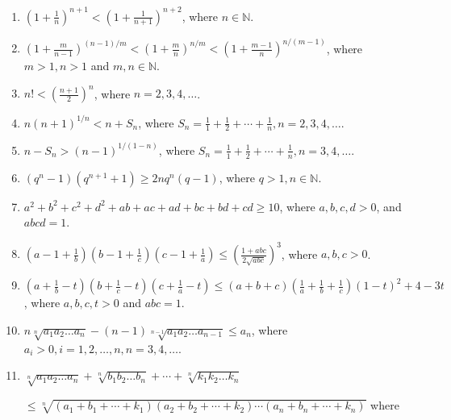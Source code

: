 \begin{enumerate}
\item $\left(1 + \frac{1}{n}\right)^{n + 1} < \left(1 + \frac{1}{n + 1}\right)^{n + 2}$, where $n\in\mathbb{N}$.
\item $\left(1 + \frac{m}{n - 1}\right)^{(n - 1)/m} < \left(1 + \frac{m}{n}\right)^{n/m} < \left(1 + \frac{m - 1}{n}\right)^{n/(m
  - 1)}$, where $m > 1, n > 1$ and $m,n \in\mathbb{N}$.
\item $n!< \left(\frac{n + 1}{2}\right)^n$, where $n = 2, 3, 4, \ldots$.
\item $n(n + 1)^{1/n} < n + S_n$, where $S_n = \frac{1}{1} + \frac{1}{2} + \cdots + \frac{1}{n}, n = 2, 3, 4, \ldots$.
\item $n - S_n > (n - 1)^{1/(1 - n)}$, where $S_n = \frac{1}{1} + \frac{1}{2} + \cdots + \frac{1}{n}, n = 3, 4, \ldots$.
\item $(q^n - 1)(q^{n + 1} + 1)\geq 2nq^n(q - 1)$, where $q > 1, n \in\mathbb{N}$.
\item $a^2 + b^2 + c^2 + d^2 + ab + ac + ad + bc + bd + cd\geq 10$, where $a, b, c, d>0$, and $abcd = 1$.
\item $\left(a - 1 + \frac{1}{b}\right)\left(b - 1 + \frac{1}{c}\right)\left(c - 1 + \frac{1}{a}\right)\leq \left(\frac{1 +
  abc}{2\sqrt{abc}}\right)^3$, where $a, b, c> 0$.
\item $\left(a + \frac{1}{b} - t\right)\left(b + \frac{1}{c} - t\right)\left(c + \frac{1}{a} - t\right)\leq (a + b +
  c)\left(\frac{1}{a} + \frac{1}{b} + \frac{1}{c}\right)(1 - t)^2 + 4 - 3t$, where $a, b,c, t > 0$ and $abc = 1$.
\item $n\sqrt[n]{a_1a_2\ldots a_n} - (n - 1)\sqrt[n - 1]{a_1a_2\ldots a_{n - 1}} \leq a_n$, where $a_i > 0, i = 1, 2,
  \ldots, n, n = 3, 4, \ldots$.
\item $\sqrt[n]{a_1a_2\ldots a_n} + \sqrt[n]{b_1b_2\ldots b_n} + \cdots + \sqrt[n]{k_1k_2\ldots k_n}$

  $\leq\sqrt[n]{(a_1 + b_1 + \cdots + k_1)(a_2 + b_2 + \cdots + k_2)\cdots(a_n + b_n + \cdots + k_n)}$ where


\end{enumerate}
